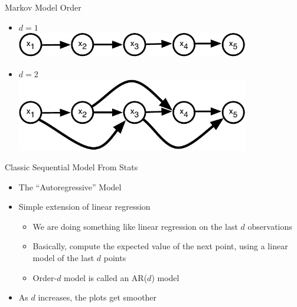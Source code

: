 \documentclass[aspectratio=169]{beamer}
\begin{document}
\begin{frame}{Markov Model Order}

\begin{itemize}
		\item $d = 1$\\
		\includegraphics[width=0.8\textwidth]{lectSeq/ar.pdf}
\vspace{1em}
		\item $d = 2$\\
		\includegraphics[width=0.8\textwidth]{lectSeq/ar2.pdf}
\end{itemize}
\end{frame}
\begin{frame}{Classic Sequential Model From Stats}

\begin{itemize}
\item The ``Autoregressive'' Model
\item Simple extension of linear regression
	\begin{itemize}
		\item We are doing something like linear regression on the last $d$ observations
		\item Basically, compute the expected value of the next point, using a linear model of the last $d$ points
		\item Order-$d$ model is called an AR($d$) model
	\end{itemize}
	\item As $d$ increases, the plots get smoother
\end{itemize}
\end{frame}
\end{document}
